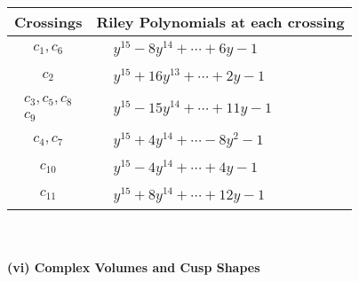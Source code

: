 \documentclass[1p]{elsarticle_modified}
\theoremstyle{definition}
\begin{document}
\begin{tabular}{m{50pt}|m{274pt}}
Crossings & \hspace{64pt}Riley Polynomials at each crossing \\
\hline $$\begin{aligned}c_{1},c_{6}\end{aligned}$$&$\begin{aligned}
&y^{15}-8 y^{14}+\cdots+6 y-1
\end{aligned}$\\
\hline $$\begin{aligned}c_{2}\end{aligned}$$&$\begin{aligned}
&y^{15}+16 y^{13}+\cdots+2 y-1
\end{aligned}$\\
\hline $$\begin{aligned}c_{3},c_{5},c_{8}\\c_{9}\end{aligned}$$&$\begin{aligned}
&y^{15}-15 y^{14}+\cdots+11 y-1
\end{aligned}$\\
\hline $$\begin{aligned}c_{4},c_{7}\end{aligned}$$&$\begin{aligned}
&y^{15}+4 y^{14}+\cdots-8 y^2-1
\end{aligned}$\\
\hline $$\begin{aligned}c_{10}\end{aligned}$$&$\begin{aligned}
&y^{15}-4 y^{14}+\cdots+4 y-1
\end{aligned}$\\
\hline $$\begin{aligned}c_{11}\end{aligned}$$&$\begin{aligned}
&y^{15}+8 y^{14}+\cdots+12 y-1
\end{aligned}$\\
\hline
\end{tabular}\\~\\
\newpage\flushleft \textbf{(vi) Complex Volumes and Cusp Shapes}
\end{document}
